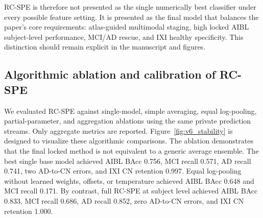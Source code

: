 RC-SPE is therefore not presented as the single numerically best classifier under every possible feature setting. It is presented as the final model that balances the paper's core requirements: atlas-guided multimodal staging, high locked AIBL subject-level performance, MCI/AD rescue, and IXI healthy specificity. This distinction should remain explicit in the manuscript and figures.

\subsection{Algorithmic ablation and calibration of RC-SPE}
\label{sec:algorithm_results}

We evaluated RC-SPE against single-model, simple averaging, equal log-pooling, partial-parameter, and aggregation ablations using the same private prediction streams. Only aggregate metrics are reported. Figure~\ref{fig:v6_stability} is designed to visualize these algorithmic comparisons. The ablation demonstrates that the final locked method is not equivalent to a generic average ensemble. The best single base model achieved AIBL BAcc 0.756, MCI recall 0.571, AD recall 0.741, two AD-to-CN errors, and IXI CN retention 0.997. Equal log-pooling without learned weights, offsets, or temperature achieved AIBL BAcc 0.648 and MCI recall 0.171. By contrast, full RC-SPE at subject level achieved AIBL BAcc 0.833, MCI recall 0.686, AD recall 0.852, zero AD-to-CN errors, and IXI CN retention 1.000.

